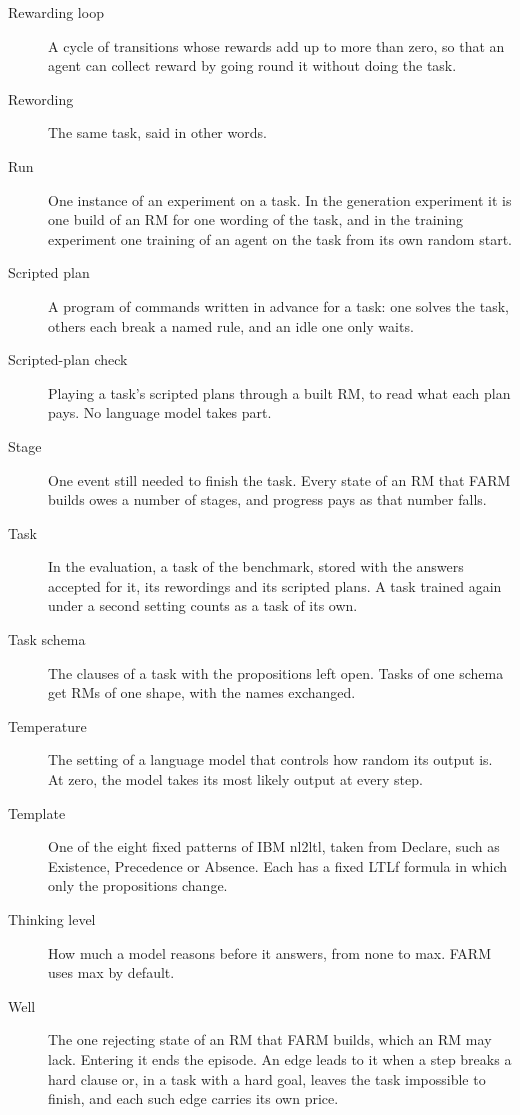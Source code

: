 \documentclass[11pt,english,listoffigures,listoftables]{tfgetsinf}
\begin{document}
\begin{description}
    \item[Rewarding loop] A cycle of transitions whose rewards add up to more than zero, so that an agent can collect reward by going round it without doing the task.
    \item[Rewording] The same task, said in other words.
    \item[Run] One instance of an experiment on a task. In the generation experiment it is one build of an RM for one wording of the task, and in the training experiment one training of an agent on the task from its own random start.
    \item[Scripted plan] A program of commands written in advance for a task: one solves the task, others each break a named rule, and an idle one only waits.
    \item[Scripted-plan check] Playing a task's scripted plans through a built RM, to read what each plan pays. No language model takes part.
    \item[Stage] One event still needed to finish the task. Every state of an RM that FARM builds owes a number of stages, and progress pays as that number falls.
    \item[Task] In the evaluation, a task of the benchmark, stored with the answers accepted for it, its rewordings and its scripted plans. A task trained again under a second setting counts as a task of its own.
    \item[Task schema] The clauses of a task with the propositions left open. Tasks of one schema get RMs of one shape, with the names exchanged.
    \item[Temperature] The setting of a language model that controls how random its output is. At zero, the model takes its most likely output at every step.
    \item[Template] One of the eight fixed patterns of IBM nl2ltl, taken from Declare, such as Existence, Precedence or Absence. Each has a fixed LTLf formula in which only the propositions change.
    \item[Thinking level] How much a model reasons before it answers, from none to max. FARM uses max by default.
    \item[Well] The one rejecting state of an RM that FARM builds, which an RM may lack. Entering it ends the episode. An edge leads to it when a step breaks a hard clause or, in a task with a hard goal, leaves the task impossible to finish, and each such edge carries its own price.
\end{description}
\end{document}
